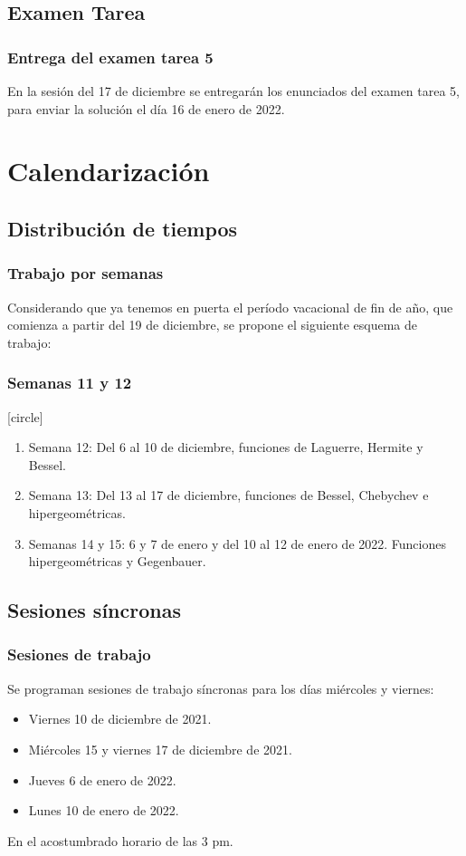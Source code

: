 \documentclass[12pt]{beamer}
\begin{document}
\subsection{Examen Tarea}

\begin{frame}
\frametitle{Entrega del examen tarea 5}
En la sesión del 17 de diciembre se entregarán los enunciados del examen tarea 5, \pause para enviar la solución el día 16 de enero de 2022.
\end{frame}

\section{Calendarización}
\subsection{Distribución de tiempos}

\begin{frame}
\frametitle{Trabajo por semanas}
Considerando que ya tenemos en puerta el período vacacional de fin de año, que comienza a partir del 19 de diciembre, se propone el siguiente esquema de trabajo:
\end{frame}
\begin{frame}
\frametitle{Semanas 11 y 12}
[circle]
\begin{enumerate}[<+->]
\item Semana 12: Del 6 al 10 de diciembre, funciones de Laguerre, Hermite y Bessel.
\item Semana 13: Del 13 al 17 de diciembre, funciones de Bessel, Chebychev e hipergeométricas.
\item Semanas 14 y 15: 6 y 7 de enero y del 10 al 12 de enero de 2022. Funciones hipergeométricas y Gegenbauer.
\end{enumerate}
\end{frame}

\subsection{Sesiones síncronas}

\begin{frame}
\frametitle{Sesiones de trabajo}
Se programan sesiones de trabajo síncronas para los días miércoles y viernes:
\begin{itemize}
\item Viernes 10 de diciembre de 2021.
\item Miércoles 15 y viernes 17 de diciembre de 2021.
\item Jueves 6 de enero de 2022.
\item Lunes 10 de enero de 2022.
\end{itemize}
En el acostumbrado horario de las 3 pm.
\end{frame}
\end{document}
